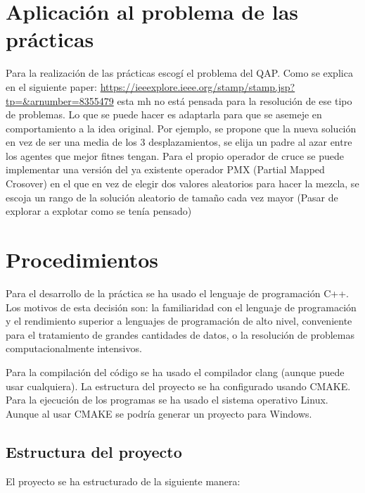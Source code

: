 \documentclass[a4paper, 12.5pt]{report}
\begin{document}
% 

% 


\section{Aplicación al problema de las prácticas}

Para la realización de las prácticas escogí el problema del QAP. Como se explica en el siguiente paper: \url{https://ieeexplore.ieee.org/stamp/stamp.jsp?tp=&arnumber=8355479} esta mh no está pensada para la resolución de ese tipo de problemas. Lo que se puede hacer es adaptarla para que se asemeje en comportamiento a la idea original. Por ejemplo, se propone que la nueva solución en vez de ser una media de los 3 desplazamientos, se elija un padre al azar entre los agentes que mejor fitnes tengan. Para el propio operador de cruce se puede implementar una versión del ya existente operador PMX (Partial Mapped Crosover) en el que en vez de elegir dos valores aleatorios para hacer la mezcla, se escoja un rango de la solución aleatorio de tamaño cada vez mayor (Pasar de explorar a explotar como se tenía pensado)


\section{Procedimientos}

Para el desarrollo de la práctica se ha usado el lenguaje de programación C++. Los motivos de esta decisión son: la familiaridad con el lenguaje de programación y el rendimiento superior a lenguajes de programación de alto nivel, conveniente para el tratamiento de grandes cantidades de datos, o la resolución de problemas computacionalmente intensivos.

Para la compilación del código se ha usado el compilador clang (aunque puede usar cualquiera). La estructura del proyecto se ha configurado usando CMAKE. Para la ejecución de los programas se ha usado el sistema operativo Linux. Aunque al usar CMAKE se podría generar un proyecto para Windows.

\subsection{Estructura del proyecto}

El proyecto se ha estructurado de la siguiente manera:
\end{document}
